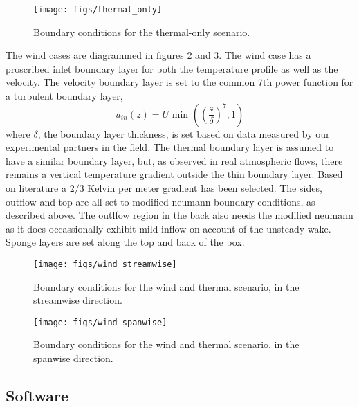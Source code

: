 \begin{figure}[!htb]
  \begin{center}
    \texttt{[image: figs/thermal\_only]}
    \caption{Boundary conditions for the thermal-only scenario. }
    \label{fig:thermalbc}
  \end{center}
\end{figure}

The wind cases are diagrammed in figures \ref{fig:windstream} and
\ref{fig:windspan}. The wind case has a proscribed inlet boundary layer
for both the temperature profile as well as the velocity. The velocity
boundary layer is set to the common 7th power function for a
turbulent boundary layer,  
\begin{equation*}
  u_{in}(z) = U \text{ min }\left(\left(\frac{z}{\delta}\right)^7,1\right)
\end{equation*}
where $\delta$, the boundary layer thickness, is set based on data
measured by our experimental partners in the field. 
The thermal boundary layer is assumed to have a similar boundary layer,
but, as observed in real atmospheric flows, there remains a vertical
temperature gradient outside the thin boundary layer. Based on
literature a $2/3$ Kelvin per meter gradient has been
selected\cite{}. The sides, outflow and top are all set to modified
neumann boundary conditions, as described above. The outlfow region in
the back also needs the modified neumann as it does occassionally
exhibit mild inflow on account of the unsteady wake. Sponge layers are
set along the top and back of the box. 

%
%
\begin{figure}[!htb]
  \begin{center}
    \texttt{[image: figs/wind\_streamwise]}
    \caption{Boundary conditions for the wind and thermal scenario, in
   the streamwise direction.} 
    \label{fig:windstream}
  \end{center}
\end{figure}

\begin{figure}[!htb]
  \begin{center}
    \texttt{[image: figs/wind\_spanwise]}
    \caption{Boundary conditions for the wind and thermal scenario, in
   the spanwise direction. } 
    \label{fig:windspan}
  \end{center}
\end{figure}


\subsection{Software}

